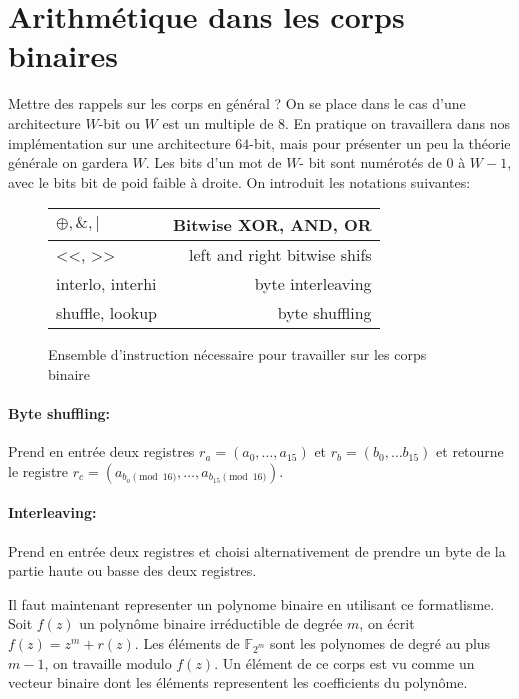 \documentclass[12pt]{article}
\begin{document}
\section{Arithmétique dans les corps binaires}
Mettre des rappels sur les corps en général ? 
\newline
On se place dans le cas d'une architecture $W$-bit ou $W$ est un multiple de $8$. En pratique on travaillera dans nos implémentation sur une architecture $64$-bit, mais pour présenter un peu la théorie générale on gardera $W$. Les bits d'un mot de $W$- bit sont numérotés de $0$ à $W-1$, avec le bits bit de poid faible à droite. On introduit les notations suivantes: 

\vspace{1cm}
\begin{figure}[h!]
    \centering
\begin{tabular}{|l|r|}
  \hline
  $\oplus, \&, |$ & Bitwise XOR, AND, OR \\
  \hline
  <<, >> & left and right bitwise shifs\\
  \hline
  interlo, interhi & byte interleaving \\
  \hline
  shuffle, lookup & byte shuffling \\
  \hline
\end{tabular}
    \caption{Ensemble d'instruction nécessaire pour travailler sur les corps binaire}
    \label{fig:set of instructions}
\end{figure}


\paragraph{Byte shuffling:} Prend en entrée deux registres $r_a = (a_0, \ldots, a_{15})$ et $r_b=(b_0, \ldots b_{15})$ et retourne le registre $r_c=(a_{b_o \pmod 16}, \ldots, a_{b_15 \pmod 16})$.

\paragraph{Interleaving:} Prend en entrée deux registres et choisi alternativement de prendre un byte de la partie haute ou basse des deux registres.


Il faut maintenant representer un polynome binaire en utilisant ce formatlisme. Soit $f(z)$ un polynôme binaire irréductible de degrée $m$, on écrit $f(z) = z^m + r(z)$. Les éléments de $\mathbb{F}_{2^m}$ sont les polynomes de degré au plus $m-1$, on travaille modulo $f(z)$. Un élément de ce corps est vu comme un vecteur binaire dont les éléments representent les coefficients du polynôme. 
\end{document}
